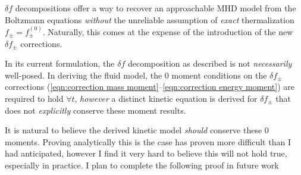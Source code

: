     $\delta\!f$ decompositions offer a way to recover an approachable MHD model from the Boltzmann equations \emph{without} the unreliable assumption of \emph{exact} thermalization $f_{\pm}  =  f_{\pm}^{(0)}$. Naturally, this comes at the expense of the introduction of the new $\delta\!f_{\pm}$ corrections.

    \line

    In its current formulation, the $\delta\!f$ decomposition as described is not \emph{necessarily} well-posed. In deriving the fluid model, the 0 moment conditions on the $\delta\!f_{\pm}$ corrections (\ref{eqn:correction mass moment}--\ref{eqn:correction energy moment}) are required to hold $\forall t$, \emph{however} a distinct kinetic equation is derived for $\delta\!f_{\pm}$ that does not \emph{explicitly} conserve these moment results.

    \begin{remark}
        It is natural to believe the derived kinetic model \emph{should} conserve these 0 moments. Proving analytically this is the case has proven more difficult than I had anticipated, however I find it very hard to believe this will not hold true, especially in practice. I plan to complete the following proof in future work
    \end{remark}

